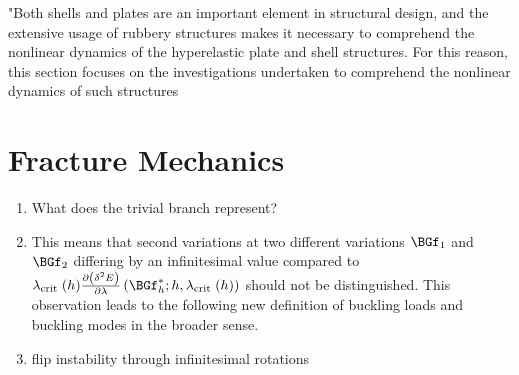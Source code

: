 \documentclass[proper,prettymath,members3]{ucsbthesis}
\begin{document}
"Both shells and plates are an important element in
structural design, and the extensive usage of rubbery
structures makes it necessary to comprehend the
nonlinear dynamics of the hyperelastic plate and shell
structures. For this reason, this section focuses on the
investigations undertaken to comprehend the nonlinear dynamics of such structures



\section{Fracture Mechanics}

\begin{enumerate}
   \item What does the trivial branch represent?
   \item This means that second variations at two different variations $\BGf_1$ and $\BGf_2$ differing by an infinitesimal value compared to  
   $\Gl_{\text {crit }}(h) \frac{\partial\left(\delta^{2} E\right)}{\partial \lambda}\left(\BGf_{h}^* ; h, \lambda_{\text {crit }}(h)\right)$ should not be distinguished. This observation leads to the following new definition of buckling loads and buckling modes in the broader sense. 
   \item flip instability through infinitesimal rotations
\end{enumerate}
\end{document}
